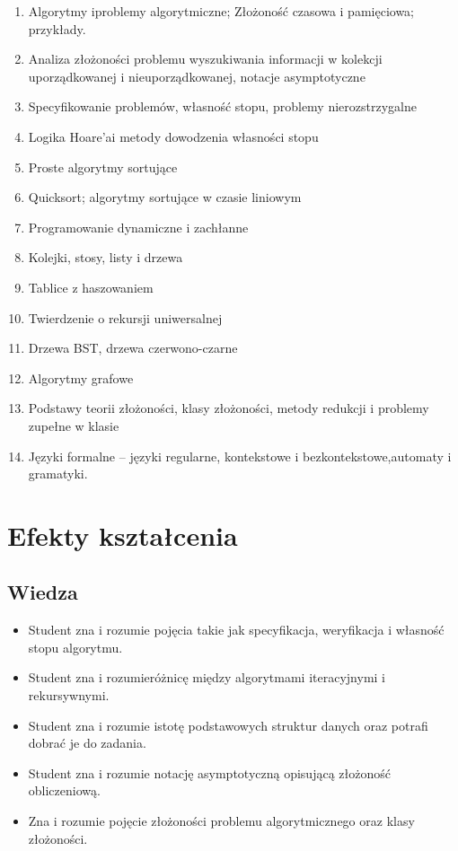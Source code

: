 \documentclass[12pt, a4paper]{article}
\begin{document}
\begin{enumerate}
  \item Algorytmy iproblemy algorytmiczne; Złożoność czasowa i pamięciowa; przykłady.
  \item Analiza złożoności problemu wyszukiwania informacji w kolekcji uporządkowanej i nieuporządkowanej, notacje asymptotyczne
  \item Specyfikowanie problemów, własność stopu, problemy nierozstrzygalne
  \item Logika Hoare’ai metody dowodzenia własności stopu
  \item Proste algorytmy sortujące
  \item Quicksort; algorytmy sortujące w czasie liniowym
  \item Programowanie dynamiczne i zachłanne
  \item Kolejki, stosy, listy i drzewa
  \item Tablice z haszowaniem
  \item Twierdzenie o rekursji uniwersalnej
  \item Drzewa BST, drzewa czerwono-czarne
  \item Algorytmy grafowe
  \item Podstawy teorii złożoności, klasy złożoności, metody redukcji i problemy zupełne w klasie
  \item Języki formalne – języki regularne, kontekstowe i bezkontekstowe,automaty i gramatyki.
\end{enumerate}

\section{Efekty kształcenia}

\subsection*{Wiedza}
\begin{itemize}
  \item Student zna i rozumie pojęcia takie jak specyfikacja, weryfikacja i własność stopu algorytmu.
  \item Student zna i rozumieróżnicę między algorytmami iteracyjnymi i rekursywnymi.
  \item Student zna i rozumie istotę podstawowych struktur danych oraz potrafi dobrać je do zadania.
  \item Student zna i rozumie notację asymptotyczną opisującą złożoność obliczeniową.
  \item Zna i rozumie pojęcie złożoności problemu algorytmicznego oraz klasy złożoności.
\end{itemize}
\end{document}

